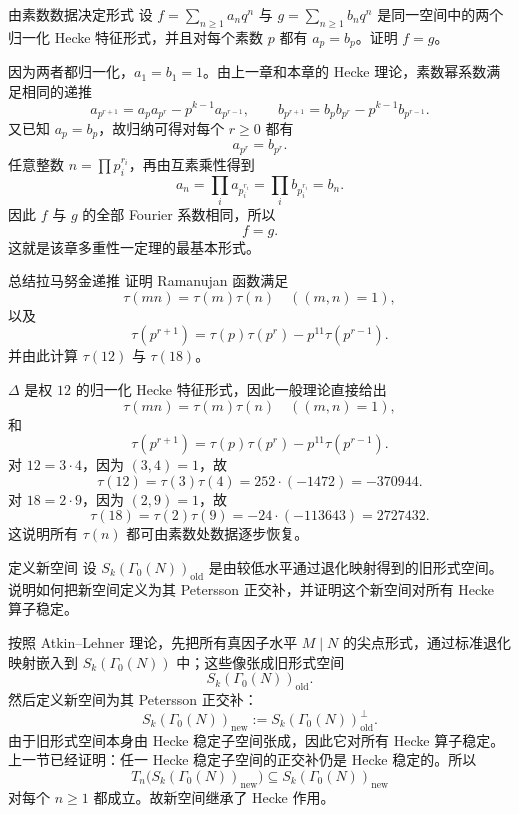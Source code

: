 \begin{problem}{由素数数据决定形式}
\hard
设 $f=\sum_{n\ge1}a_nq^n$ 与 $g=\sum_{n\ge1}b_nq^n$ 是同一空间中的两个归一化 Hecke 特征形式，并且对每个素数 $p$ 都有 $a_p=b_p$。证明 $f=g$。
\end{problem}
\begin{solution}
因为两者都归一化，$a_1=b_1=1$。由上一章和本章的 Hecke 理论，素数幂系数满足相同的递推
\[
a_{p^{r+1}}=a_pa_{p^r}-p^{k-1}a_{p^{r-1}},
\qquad
b_{p^{r+1}}=b_pb_{p^r}-p^{k-1}b_{p^{r-1}}.
\]
又已知 $a_p=b_p$，故归纳可得对每个 $r\ge0$ 都有
\[
a_{p^r}=b_{p^r}.
\]
任意整数 $n=\prod p_i^{r_i}$，再由互素乘性得到
\[
a_n=\prod_i a_{p_i^{r_i}}=\prod_i b_{p_i^{r_i}}=b_n.
\]
因此 $f$ 与 $g$ 的全部 Fourier 系数相同，所以
\[
f=g.
\]
这就是该章多重性一定理的最基本形式。
\end{solution}

\begin{problem}{总结拉马努金递推}
\hard
证明 Ramanujan 函数满足
\[
\tau(mn)=\tau(m)\tau(n)\quad ((m,n)=1),
\]
以及
\[
\tau(p^{r+1})=\tau(p)\tau(p^r)-p^{11}\tau(p^{r-1}).
\]
并由此计算 $\tau(12)$ 与 $\tau(18)$。
\end{problem}
\begin{solution}
$\Delta$ 是权 $12$ 的归一化 Hecke 特征形式，因此一般理论直接给出
\[
\tau(mn)=\tau(m)\tau(n)\quad ((m,n)=1),
\]
和
\[
\tau(p^{r+1})=\tau(p)\tau(p^r)-p^{11}\tau(p^{r-1}).
\]
对 $12=3\cdot4$，因为 $(3,4)=1$，故
\[
\tau(12)=\tau(3)\tau(4)=252\cdot(-1472)=-370944.
\]
对 $18=2\cdot9$，因为 $(2,9)=1$，故
\[
\tau(18)=\tau(2)\tau(9)=-24\cdot(-113643)=2727432.
\]
这说明所有 $\tau(n)$ 都可由素数处数据逐步恢复。
\end{solution}

\begin{problem}{定义新空间}
\hard
设 $S_k(\Gamma_0(N))_{\mathrm{old}}$ 是由较低水平通过退化映射得到的旧形式空间。说明如何把新空间定义为其 Petersson 正交补，并证明这个新空间对所有 Hecke 算子稳定。
\end{problem}
\begin{solution}
按照 Atkin--Lehner 理论，先把所有真因子水平 $M\mid N$ 的尖点形式，通过标准退化映射嵌入到 $S_k(\Gamma_0(N))$ 中；这些像张成旧形式空间
\[
S_k(\Gamma_0(N))_{\mathrm{old}}.
\]
然后定义新空间为其 Petersson 正交补：
\[
S_k(\Gamma_0(N))_{\mathrm{new}}:=S_k(\Gamma_0(N))_{\mathrm{old}}^{\perp}.
\]
由于旧形式空间本身由 Hecke 稳定子空间张成，因此它对所有 Hecke 算子稳定。上一节已经证明：任一 Hecke 稳定子空间的正交补仍是 Hecke 稳定的。所以
\[
T_n\bigl(S_k(\Gamma_0(N))_{\mathrm{new}}\bigr)\subseteq S_k(\Gamma_0(N))_{\mathrm{new}}
\]
对每个 $n\ge1$ 都成立。故新空间继承了 Hecke 作用。
\end{solution}

